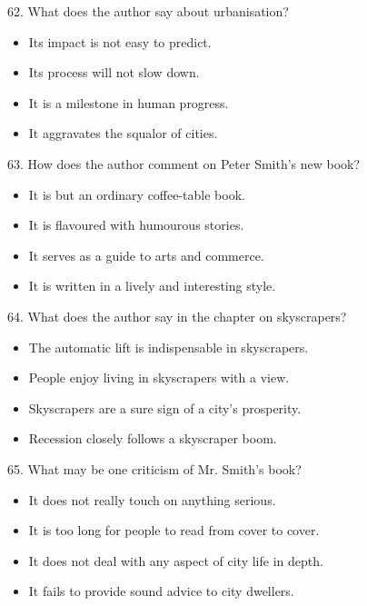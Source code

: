 \documentclass[UTF8,11pt]{ctexart}
\begin{document}
62. What does the author say about urbanisation?


\begin{itemize}[leftmargin=2em,itemsep=.2em,topsep=.4em]\item[A.] Its impact is not easy to predict.
\item[B.] Its process will not slow down.
\item[C.] It is a milestone in human progress.
\item[D.] It aggravates the squalor of cities.
\end{itemize}

63. How does the author comment on Peter Smith’s new book?


\begin{itemize}[leftmargin=2em,itemsep=.2em,topsep=.4em]\item[A.] It is but an ordinary coffee-table book.
\item[B.] It is flavoured with humourous stories.
\item[C.] It serves as a guide to arts and commerce.
\item[D.] It is written in a lively and interesting style.
\end{itemize}

64. What does the author say in the chapter on skyscrapers?


\begin{itemize}[leftmargin=2em,itemsep=.2em,topsep=.4em]\item[A.] The automatic lift is indispensable in skyscrapers.
\item[B.] People enjoy living in skyscrapers with a view.
\item[C.] Skyscrapers are a sure sign of a city’s prosperity.
\item[D.] Recession closely follows a skyscraper boom.
\end{itemize}

65. What may be one criticism of Mr. Smith’s book?


\begin{itemize}[leftmargin=2em,itemsep=.2em,topsep=.4em]\item[A.] It does not really touch on anything serious.
\item[B.] It is too long for people to read from cover to cover.
\item[C.] It does not deal with any aspect of city life in depth.
\item[D.] It fails to provide sound advice to city dwellers.
\end{itemize}
\end{document}
